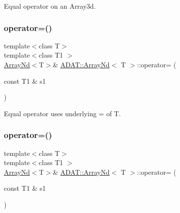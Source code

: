 Equal operator on an Array3d. 

\mbox{\label{classADAT_1_1ArrayNd_a4b2d8a768beccefe12844f27c50b058b}} 
\subsubsection{\texorpdfstring{operator=()}{operator=()}\hspace{0.1cm}{\footnotesize\ttfamily [9/10]}}
{\footnotesize\ttfamily template$<$class T$>$ \\
template$<$class T1 $>$ \\
\mbox{\hyperlink{classADAT_1_1ArrayNd}{Array\+Nd}}$<$T$>$\& \mbox{\hyperlink{classADAT_1_1ArrayNd}{A\+D\+A\+T\+::\+Array\+Nd}}$<$ T $>$\+::operator= (\begin{DoxyParamCaption}\item[{const T1 \&}]{s1 }\end{DoxyParamCaption})\hspace{0.3cm}{\ttfamily [inline]}}



Equal operator uses underlying = of T. 

\mbox{\label{classADAT_1_1ArrayNd_a4b2d8a768beccefe12844f27c50b058b}} 
\subsubsection{\texorpdfstring{operator=()}{operator=()}\hspace{0.1cm}{\footnotesize\ttfamily [10/10]}}
{\footnotesize\ttfamily template$<$class T$>$ \\
template$<$class T1 $>$ \\
\mbox{\hyperlink{classADAT_1_1ArrayNd}{Array\+Nd}}$<$T$>$\& \mbox{\hyperlink{classADAT_1_1ArrayNd}{A\+D\+A\+T\+::\+Array\+Nd}}$<$ T $>$\+::operator= (\begin{DoxyParamCaption}\item[{const T1 \&}]{s1 }\end{DoxyParamCaption})\hspace{0.3cm}{\ttfamily [inline]}}



